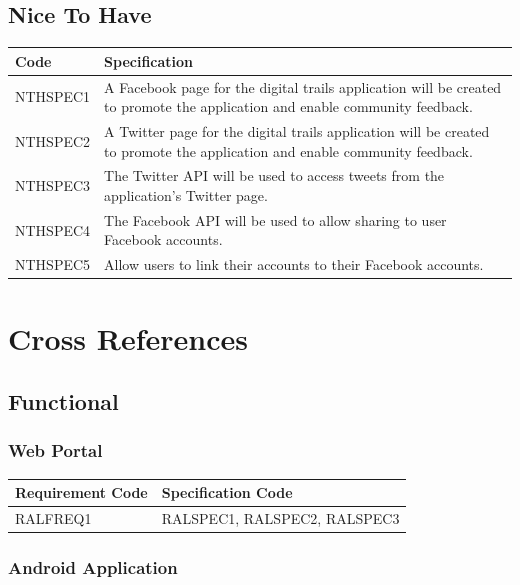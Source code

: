 \documentclass[11pt,a4paper]{article}
\begin{document}
\subsection{Nice To Have}
\label{sec:nice-to-have-specs}

\begin{longtable}{|p{2.5cm}p{13cm}|}
\hline
\textbf{Code} & \textbf{Specification} \\

\hline
NTHSPEC1 & A Facebook page for the digital trails application will be created to promote the application and enable community feedback. \\ \hline
NTHSPEC2 &  A Twitter page for the digital trails application will be created to promote the application and enable community feedback. \\ \hline
NTHSPEC3 & The Twitter API will be used to access tweets from the application's Twitter page. \\ \hline
NTHSPEC4 & The Facebook API will be used to allow sharing to user Facebook accounts. \\ \hline
NTHSPEC5 & Allow users to link their accounts to their Facebook accounts. \\ \hline
\end{longtable}


\section{Cross References}
\label{sec:cross-refs}

\subsection{Functional}

\subsubsection{Web Portal}

\begin{longtable}{|p{2.7cm}|p{10cm}|}
\hline
\textbf{Requirement Code} & \textbf{Specification Code} \\

\hline \hline RALFREQ1 & RALSPEC1, RALSPEC2, RALSPEC3  \\
\hline 
\end{longtable}


\subsubsection{Android Application}
\end{document}
